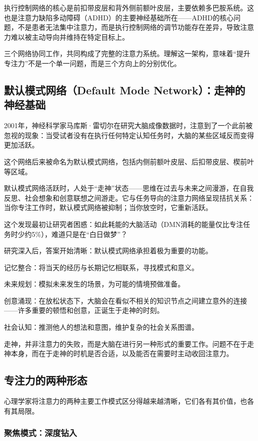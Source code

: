 \documentclass[11pt]{article}
\begin{document}
执行控制网络的核心是前扣带皮层和背外侧前额叶皮层，主要依赖多巴胺系统。这也是注意力缺陷多动障碍（ADHD）的主要神经基础所在——ADHD的核心问题，不是患者无法集中注意力，而是执行控制网络的调节功能存在差异，导致注意力难以被主动导向并维持在特定目标上。

三个网络协同工作，共同构成了完整的注意力系统。理解这一架构，意味着“提升专注力”不是一个单一问题，而是三个方向上的分别优化。
\subsection{默认模式网络（Default Mode Network）：走神的神经基础}
\label{sec:org6475026}

2001年，神经科学家马库斯·雷切尔在研究大脑成像数据时，注意到了一个此前被忽视的现象：当受试者没有在执行任何特定认知任务时，大脑的某些区域反而变得更加活跃。

这个网络后来被命名为默认模式网络，包括内侧前额叶皮层、后扣带皮层、楔前叶等区域。

默认模式网络活跃时，人处于“走神”状态——思维在过去与未来之间漫游，在自我反思、社会想象和创意联想之间游走。它与任务导向的注意力网络呈现拮抗关系：当你专注工作时，默认模式网络被抑制；当你放空时，它重新活跃。

这个发现最初让研究者困惑：如此耗能的大脑活动（DMN消耗的能量仅比专注任务时少约5\%），难道只是在“白日做梦”？

研究深入后，答案开始清晰：默认模式网络承担着极为重要的功能。

记忆整合：将当天的经历与长期记忆相联系，寻找模式和意义。

未来规划：模拟未来发生的场景，为可能的情境预做准备。

创意涌现：在放松状态下，大脑会在看似不相关的知识节点之间建立意外的连接——许多重要的顿悟和创意，正诞生于走神的时刻。

社会认知：推测他人的想法和意图，维护复杂的社会关系图谱。

走神，并非注意力的失败，而是大脑在进行另一种形式的重要工作。问题不在于走神本身，而在于走神的时机是否合适，以及能否在需要时主动收回注意力。
\subsection{专注力的两种形态}
\label{sec:orgc1397f1}

心理学家将注意力的两种主要工作模式区分得越来越清晰，它们各有其价值，也各有其局限。
\subsubsection{聚焦模式：深度钻入}
\label{sec:org57c9b43}
\end{document}

